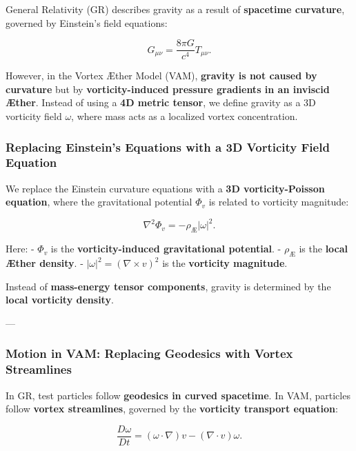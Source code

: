 \documentclass[a4paper,10pt]{article}
\begin{document}
General Relativity (GR) describes gravity as a result of \textbf{spacetime curvature}, governed by Einstein's field equations:

\begin{equation*}
    G_{\mu\nu} = \frac{8\pi G}{c^4} T_{\mu\nu}.
\end{equation*}

However, in the Vortex Æther Model (VAM), \textbf{gravity is not caused by curvature} but by \textbf{vorticity-induced pressure gradients in an inviscid Æther}. Instead of using a \textbf{4D metric tensor}, we define gravity as a 3D vorticity field \( \omega \), where mass acts as a localized vortex concentration.

\subsubsection*{Replacing Einstein's Equations with a 3D Vorticity Field Equation}

We replace the Einstein curvature equations with a \textbf{3D vorticity-Poisson equation}, where the gravitational potential \( \Phi_v \) is related to vorticity magnitude:

\begin{equation*}
    \nabla^2 \Phi_v = - \rho_\text{Æ} |\omega|^2.
\end{equation*}

Here:
- \( \Phi_v \) is the \textbf{vorticity-induced gravitational potential}.
- \( \rho_\text{Æ} \) is the \textbf{local Æther density}.
- \( |\omega|^2 = (\nabla \times v)^2 \) is the \textbf{vorticity magnitude}.

Instead of \textbf{mass-energy tensor components}, gravity is determined by the \textbf{local vorticity density}.

---

\subsubsection*{Motion in VAM: Replacing Geodesics with Vortex Streamlines}

In GR, test particles follow \textbf{geodesics in curved spacetime}. In VAM, particles follow \textbf{vortex streamlines}, governed by the \textbf{vorticity transport equation}:

\begin{equation*}
    \frac{D\omega}{Dt} = (\omega \cdot \nabla) v - (\nabla \cdot v) \omega.
\end{equation*}
\end{document}
